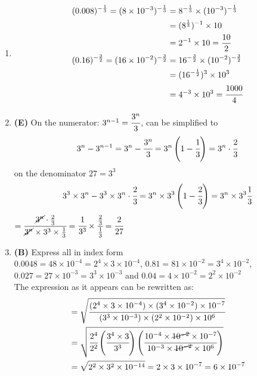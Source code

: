 \begin{multicols}{2}
\begin{enumerate}[label={\arabic*.}]
    \item 
    \begin{align*} 
        (0.008)^{-\frac{1}{3}} = (8 \times 10^{-3})^{-\frac{1}{3}} &= 8^{-\frac{1}{3}} \times (10^{-3})^{-\frac{1}{3}} \\
        & = (8^{\frac{1}{3}})^{-1} \times 10 \\
        & = 2^{-1} \times 10  = \dfrac{10}{2}\\
        (0.16)^{-\frac{3}{2}} = (16 \times 10^{-2})^{-\frac{3}{2}} &= 16^{-\frac{3}{2}} \times (10^{-2})^{-\frac{3}{2}} \\
        &= (16^{-\frac{1}{2}})^3 \times 10^3 \\
        & = 4^{-3} \times 10^3 =\cfrac{1000}{4}
    \end{align*}
    \item \textbf{(E)} On the numerator: $3^{n-1} = \cfrac{3^n}{3}$,  can be simplified to
    $$3^n - 3^{n-1}= 3^n - \cfrac{3^n}{3} = 3^n\left(1- \cfrac{1}{3}\right) = 3^n \cdot \cfrac{2}{3}$$
    on the denominator $27 = 3^3$ 
    $$3^3 \times 3^n - 3^3 \times 3^n \cdot \cfrac{2}{3} = 3^n \times 3^3\left(1-\cfrac{2}{3}\right) = 3^n \times 3^3 \cfrac{1}{3}$$ 
         $= \cfrac{\cancel{3^n} \cdot \frac{2}{3}}{\cancel{3^n} \times 3^3 \times \frac{1}{3}}  = \cfrac{1}{3^{3}} \times \cfrac{\frac{2}{3}}{\frac{1}{3}} = \cfrac{2}{27}$

    \item \textbf{(B)} Express all in index form \\
    $0.0048 = 48 \times 10^{-4} = 2^4 \times 3 \times 10^{-4}$, $0.81 = 81 \times 10^{-2} = 3^4 \times 10^{-2}$, $0.027 = 27 \times 10^{-3} = 3^3 \times 10^{-3}$ and $0.04 = 4 \times 10^{-2} = 2^2 \times 10^{-2}$ \\
    The expression as it appears can be rewritten as: 
    \begin{align*}
     &= \sqrt{\cfrac{(2^4 \times 3 \times 10^{-4}) \times (3^4 \times 10^{-2}) \times 10^{-7}}{(3^3 \times 10^{-3}) \times (2^2 \times 10^{-2}) \times 10^6 }} \\
     & = \sqrt{\cfrac{2^4 }{2^2}\left( \cfrac{3^4 \times 3}{3^3} \right) \left(\cfrac{10^{-4} \times \cancel{10^{-2}} \times 10^{-7}}{10^{-3} \times \cancel{10^{-2}} \times 10^6}\right) } \\
     & = \sqrt{2^2 \times 3^2 \times 10^{-14} } = 2 \times 3 \times 10^{-7} = 6 \times 10^{-7}
    \end{align*}


\end{enumerate}
\end{multicols}
